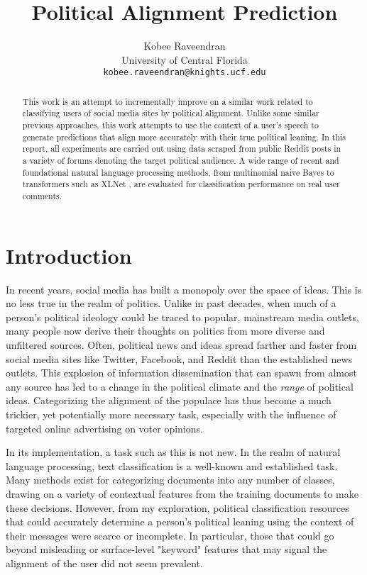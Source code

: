 \documentclass[11pt,a4paper]{article}
\title{Political Alignment Prediction}
\author{Kobee Raveendran \\
  University of Central Florida \\
  \texttt{kobee.raveendran@knights.ucf.edu}}
\date{}
\begin{document}
\maketitle
\begin{abstract}
This work is an attempt to incrementally improve on a similar work related to classifying users of social media sites by political alignment. Unlike some similar previous approaches, this work attempts to use the context of a user's speech to generate predictions that align more accurately with their true political leaning. In this report, all experiments are carried out using data scraped from public Reddit posts in a variety of forums denoting the target political audience. A wide range of recent and foundational natural language processing methods, from multinomial naive Bayes to transformers such as XLNet \cite{xlnet}, are evaluated for classification performance on real user comments.
\end{abstract}

\section{Introduction}

In recent years, social media has built a monopoly over the space of ideas. This is no less true in the realm of politics. Unlike in past decades, when much of a person's political ideology could be traced to popular, mainstream media outlets, many people now derive their thoughts on politics from more diverse and unfiltered sources. Often, political news and ideas spread farther and faster from social media sites like Twitter, Facebook, and Reddit than the established news outlets. This explosion of information dissemination that can spawn from almost any source has led to a change in the political climate and the \textit{range} of political ideas. Categorizing the alignment of the populace has thus become a much trickier, yet potentially more necessary task, especially with the influence of targeted online advertising on voter opinions.

In its implementation, a task such as this is not new. In the realm of natural language processing, text classification is a well-known and established task. Many methods exist for categorizing documents into any number of classes, drawing on a variety of contextual features from the training documents to make these decisions. However, from my exploration, political classification resources that could accurately determine a person's political leaning using the context of their messages were scarce or incomplete. In particular, those that could go beyond misleading or surface-level "keyword" features that may signal the alignment of the user did not seem prevalent.
\end{document}
